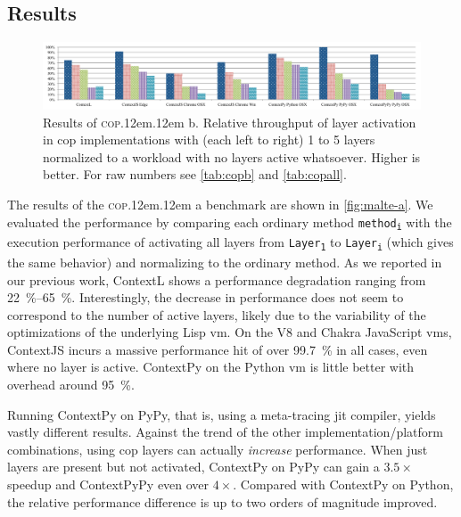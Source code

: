 \documentclass[preprint,english,10pt,nonatbib]{sigplanconf}
\DeclareRobustCommand*\copa{\textsc{cop}\kern .12em\oldstylenums{09}\kern .12em a\xspace}
\DeclareRobustCommand*\copb{\textsc{cop}\kern .12em\oldstylenums{09}\kern .12em b\xspace}
\begin{document}

\subsection{Results}

\begin{figure}
  \centering
  \includegraphics[width=\linewidth]{bench/malte-b}
  \caption{Results of \copb. Relative throughput of layer activation in
    \protect\acs{cop} implementations with (each left to right) 1 to 5 layers
    normalized to a workload with no layers active whatsoever. Higher is
    better. For raw numbers see \autoref{tab:copb} and \autoref{tab:copall}.}
  \label{fig:malte-b}
\end{figure}

The results of the \copa benchmark are shown in \autoref{fig:malte-a}. We
evaluated the performance by comparing each ordinary method
\texttt{method\textsubscript{i}} with the execution performance of activating
all layers from \texttt{Layer\textsubscript{1}} to
\texttt{Layer\textsubscript{i}} (which gives the same behavior) and normalizing
to the ordinary method. As we reported in our previous work, ContextL shows a
performance degradation ranging from \SIrange{22}{65}{\percent}. Interestingly,
the decrease in performance does not seem to correspond to the number of active
layers, likely due to the variability of the optimizations of the underlying
Lisp \ac{vm}. On the V8 and Chakra JavaScript \acp{vm}, ContextJS incurs a
massive performance hit of over \SI{99.7}{\percent} in all cases, even where no
layer is active. ContextPy on the Python \ac{vm} is little better with overhead
around \SI{95}{\percent}.

Running ContextPy on PyPy, that is, using a meta-tracing \ac{jit} compiler,
yields vastly different results. Against the trend of the other
implementation/platform combinations, using \ac{cop} layers can actually
\emph{increase} performance. When just layers are present but not activated,
ContextPy on PyPy can gain a \(3.5\times\) speedup and ContextPyPy even over
\(4\times\). Compared with ContextPy on Python, the relative performance
difference is up to two orders of magnitude improved.
\end{document}
